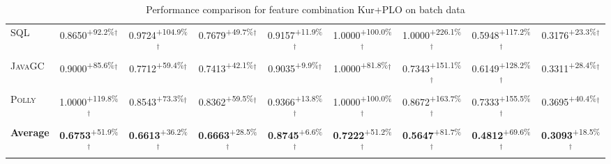 \begin{table}[htbp]
\begin{tabular}{l|cccc|cccc}
\textsc{SQL} & \cellcolor{green!30}0.8650\textsuperscript{+92.2\%}$^\dagger$ & \cellcolor{green!30}0.9724\textsuperscript{+104.9\%}$^\dagger$ & \cellcolor{green!30}0.7679\textsuperscript{+49.7\%}$^\dagger$ & \cellcolor{green!30}0.9157\textsuperscript{+11.9\%}$^\dagger$ & \cellcolor{green!30}1.0000\textsuperscript{+100.0\%}$^\dagger$ & \cellcolor{green!30}1.0000\textsuperscript{+226.1\%}$^\dagger$ & \cellcolor{green!30}0.5948\textsuperscript{+117.2\%}$^\dagger$ & \cellcolor{green!30}0.3176\textsuperscript{+23.3\%}$^\dagger$ \\
\textsc{JavaGC} & \cellcolor{green!30}0.9000\textsuperscript{+85.6\%}$^\dagger$ & \cellcolor{green!30}0.7712\textsuperscript{+59.4\%}$^\dagger$ & \cellcolor{green!30}0.7413\textsuperscript{+42.1\%}$^\dagger$ & \cellcolor{green!30}0.9035\textsuperscript{+9.9\%}$^\dagger$ & \cellcolor{green!30}1.0000\textsuperscript{+81.8\%}$^\dagger$ & \cellcolor{green!30}0.7343\textsuperscript{+151.1\%}$^\dagger$ & \cellcolor{green!30}0.6149\textsuperscript{+128.2\%}$^\dagger$ & \cellcolor{green!30}0.3311\textsuperscript{+28.4\%}$^\dagger$ \\
\textsc{Polly} & \cellcolor{green!30}1.0000\textsuperscript{+119.8\%}$^\dagger$ & \cellcolor{green!30}0.8543\textsuperscript{+73.3\%}$^\dagger$ & \cellcolor{green!30}0.8362\textsuperscript{+59.5\%}$^\dagger$ & \cellcolor{green!30}0.9366\textsuperscript{+13.8\%}$^\dagger$ & \cellcolor{green!30}1.0000\textsuperscript{+100.0\%}$^\dagger$ & \cellcolor{green!30}0.8672\textsuperscript{+163.7\%}$^\dagger$ & \cellcolor{green!30}0.7333\textsuperscript{+155.5\%}$^\dagger$ & \cellcolor{green!30}0.3695\textsuperscript{+40.4\%}$^\dagger$ \\
\hline
\textbf{Average} & \cellcolor{green!30}\textbf{0.6753}\textsuperscript{+51.9\%}$^\dagger$ & \cellcolor{green!30}\textbf{0.6613}\textsuperscript{+36.2\%}$^\dagger$ & \cellcolor{green!30}\textbf{0.6663}\textsuperscript{+28.5\%}$^\dagger$ & \cellcolor{green!30}\textbf{0.8745}\textsuperscript{+6.6\%}$^\dagger$ & \cellcolor{green!30}\textbf{0.7222}\textsuperscript{+51.2\%}$^\dagger$ & \cellcolor{green!30}\textbf{0.5647}\textsuperscript{+81.7\%}$^\dagger$ & \cellcolor{green!30}\textbf{0.4812}\textsuperscript{+69.6\%}$^\dagger$ & \cellcolor{green!30}\textbf{0.3093}\textsuperscript{+18.5\%}$^\dagger$ \\
\hline
\end{tabular}
\caption{Performance comparison for feature combination Kur+PLO on batch data}
\label{tab:combo_Kur_PLO_performance_batch}
\end{table}